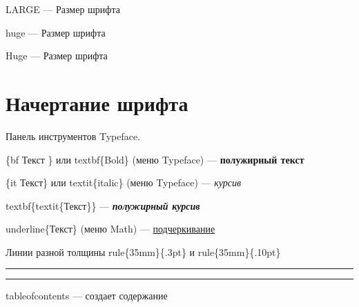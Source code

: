 \documentclass[10pt,a4paper]{article}
\begin{document}
LARGE — \large Размер шрифта \normalsize

huge — \huge Размер шрифта \normalsize

Huge — \huge Размер шрифта \normalsize

\section{Начертание шрифта}

Панель инструментов Typeface.

\{bf Текст \} или textbf\{Bold\} (меню Typeface) — {\bf полужирный текст}


\{it Текст\} или textit\{italic\} (меню Typeface) — {\it курсив}

textbf\{textit\{Текст\}\} — \textbf{\textit {полужирный курсив}}

underline\{Текст\} (меню Math) — \underline{подчеркивание}

Линии разной толщины rule\{35mm\}\{.3pt\} и rule\{35mm\}\{.10pt\}

\rule{35mm}{.3pt}

\rule{35mm}{.10pt}

tableofcontents — создает содержание
\end{document}
